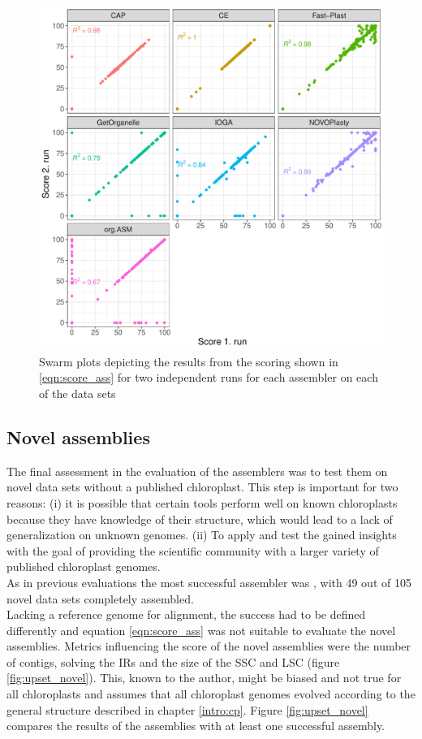 \begin{figure}[H]
\centering
\includegraphics[height=.49\textheight, width=.95\textwidth]{Figures/repro}
\decoRule
\caption[Comparison between two runs with the same assembler for consistency testing
]{Swarm plots depicting the results from the scoring shown in \ref{eqn:score_ass} for two
  independent runs for each assembler on each of the data sets}
\label{fig:consisplot}
\end{figure}


\subsection{Novel assemblies}
 
The final assessment in the evaluation of the assemblers was to test them on novel data
sets without a published chloroplast. This step is important for two reasons: (i) it is
possible that certain tools perform well on known chloroplasts because they have knowledge
of their structure, which would lead to a lack of generalization on unknown genomes. (ii)
To apply and test the gained insights with the goal of providing
the scientific community with a larger variety of published chloroplast genomes.\\
As in previous evaluations the most successful assembler was \go, with 49 out of 105 novel data sets completely assembled. \\
Lacking a reference genome for alignment, the success had to be defined differently and
equation \ref{eqn:score_ass} was not suitable to evaluate the novel assemblies. Metrics
influencing the score of the novel assemblies were the number of contigs, solving the IRs
and the size of the SSC and LSC (figure \ref{fig:upset_novel}). This, known to the author,
might be biased and not true for all chloroplasts and assumes that all chloroplast genomes
evolved according to the general structure described in chapter \ref{intro:cp}. Figure
\ref{fig:upset_novel} compares the results of the assemblies with at least one successful
assembly.

